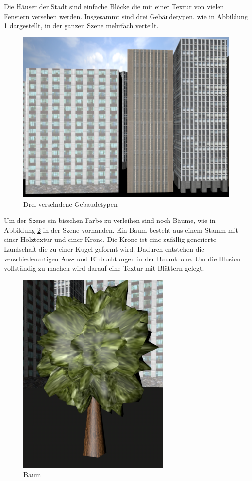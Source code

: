Die Häuser der Stadt sind einfache Blöcke die mit einer Textur von vielen Fenstern versehen werden. Insgesammt sind drei Gebäudetypen, wie in Abbildung \ref{screenshot_buildings} dargestellt,  in der ganzen Szene mehrfach verteilt.\\
\begin{figure}[htbp]
\centering 
\includegraphics[scale=0.4]{src/screenshot_buildings.png}
\caption{Drei verschidene Gebäudetypen} %
\label{screenshot_buildings} %
\end{figure}
Um der Szene ein bisschen Farbe zu verleihen sind noch Bäume, wie in Abbildung \ref{screenshot_tree} in der Szene vorhanden. Ein Baum besteht aus einem Stamm mit einer Holztextur und einer Krone. Die Krone ist eine zufällig generierte Landschaft die zu einer Kugel geformt wird. Dadurch entstehen die verschiedenartigen Aus- und Einbuchtungen in der Baumkrone. Um die Illusion vollständig zu machen wird darauf eine Textur mit Blättern gelegt.\\

\begin{figure}[htbp]
\centering 
\includegraphics[scale=0.4]{src/screenshot_tree.png}
\caption{Baum} %
\label{screenshot_tree} %
\end{figure}

